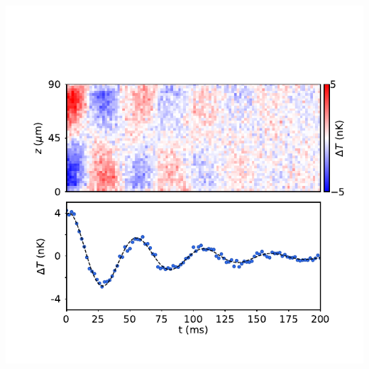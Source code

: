 \documentclass[26pt, paperwidth=36in,paperheight=48in]{tikzposter} %
\begin{document}
\begin{columns}
{\begin{minipage}{0.2\textwidth}
	\includegraphics[width=17cm,
	trim=0cm 0cm 0cm 9.67cm,clip]{figures/TimeEvolution_Slides_noedge.pdf}\\
	

\end{minipage}}
\end{columns}
\end{document}
